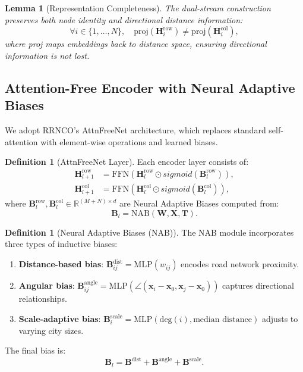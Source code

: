 \documentclass[journal,twoside,web]{ieeecolor}
\newtheorem{lemma}[theorem]{Lemma}
\theoremstyle{definition}
\newtheorem{definition}[theorem]{Definition}
\theoremstyle{remark}
\theoremstyle{definition}
\begin{document}
\begin{lemma}[Representation Completeness]
The dual-stream construction preserves both node identity and directional distance information:
\begin{equation}
\forall i \in \{1,\ldots,N\}, \quad \text{proj}(\mathbf{H}^{\text{row}}_i) \neq \text{proj}(\mathbf{H}^{\text{col}}_i),
\end{equation}
where proj maps embeddings back to distance space, ensuring directional information is not lost.
\end{lemma}

\subsection{Attention-Free Encoder with Neural Adaptive Biases}

We adopt RRNCO's AttnFreeNet architecture, which replaces standard self-attention with element-wise operations and learned biases.

\begin{definition}[AttnFreeNet Layer]
Each encoder layer consists of:
\begin{align}
\mathbf{H}^{\text{row}}_{l+1} &= \text{FFN}\left(\mathbf{H}^{\text{row}}_l \odot sigmoid(\mathbf{B}^{\text{row}}_l)\right), \\
\mathbf{H}^{\text{col}}_{l+1} &= \text{FFN}\left(\mathbf{H}^{\text{col}}_l \odot sigmoid(\mathbf{B}^{\text{col}}_l)\right),
\end{align}
where $\mathbf{B}^{\text{row}}_l, \mathbf{B}^{\text{col}}_l \in \mathbb{R}^{(M+N) \times d}$ are Neural Adaptive Biases computed from:
\begin{equation}
\mathbf{B}_l = \text{NAB}(\mathbf{W}, \mathbf{X}, \mathbf{T}).
\end{equation}
\end{definition}

\begin{definition}[Neural Adaptive Biases (NAB)]
The NAB module incorporates three types of inductive biases:
\begin{enumerate}
    \item \textbf{Distance-based bias}: $\mathbf{B}^{\text{dist}}_{ij} = \text{MLP}(w_{ij})$ encodes road network proximity.
    \item \textbf{Angular bias}: $\mathbf{B}^{\text{angle}}_{ij} = \text{MLP}\left(\angle(\mathbf{x}_i - \mathbf{x}_0, \mathbf{x}_j - \mathbf{x}_0)\right)$ captures directional relationships.
    \item \textbf{Scale-adaptive bias}: $\mathbf{B}^{\text{scale}}_i = \text{MLP}(\text{deg}(i), \text{median distance})$ adjusts to varying city sizes.
\end{enumerate}
The final bias is:
\begin{equation}
\mathbf{B}_l = \mathbf{B}^{\text{dist}} + \mathbf{B}^{\text{angle}} + \mathbf{B}^{\text{scale}}.
\end{equation}
\end{definition}
\end{document}
